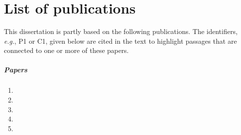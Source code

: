 
\chapter*{List of publications}

This dissertation is partly based on the following publications. The identifiers, \textit{e.g.}, P1 or C1, given below are cited in the text to highlight passages that are connected to one or more of these papers.

\paragraph{Papers}
\begin{enumerate}[P1]
    \item {}
    \item {}
    \item {}
    \item {}
    \item {}

\end{enumerate}

%
